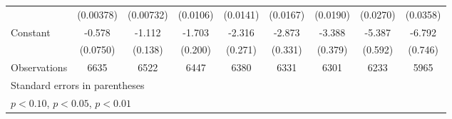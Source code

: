 \begin{table}[htbp]
\begin{tabular}{l*{8}{c}}
                    &   (0.00378)         &   (0.00732)         &    (0.0106)         &    (0.0141)         &    (0.0167)         &    (0.0190)         &    (0.0270)         &    (0.0358)         \\
[1em]
Constant            &      -0.578\sym{***}&      -1.112\sym{***}&      -1.703\sym{***}&      -2.316\sym{***}&      -2.873\sym{***}&      -3.388\sym{***}&      -5.387\sym{***}&      -6.792\sym{***}\\
                    &    (0.0750)         &     (0.138)         &     (0.200)         &     (0.271)         &     (0.331)         &     (0.379)         &     (0.592)         &     (0.746)         \\
\hline
Observations        &        6635         &        6522         &        6447         &        6380         &        6331         &        6301         &        6233         &        5965         \\
\hline\hline
\multicolumn{9}{l}{\footnotesize Standard errors in parentheses}\\
\multicolumn{9}{l}{\footnotesize \sym{*} \(p<0.10\), \sym{**} \(p<0.05\), \sym{***} \(p<0.01\)}\\
\end{tabular}
\end{table}
